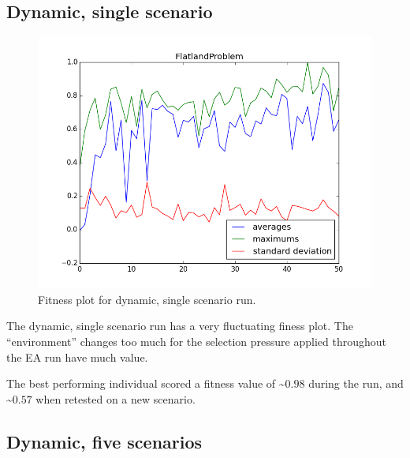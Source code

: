\documentclass[twoside]{article}
\begin{document}
\begin{multicols}{2}
  \subsection{Dynamic, single scenario}
  
  \begin{figure}[H]
    \centering
    \includegraphics[width=\linewidth]{images/dynamic_1.png}
    \caption{Fitness plot for dynamic, single scenario run.} \label{fig:static-single}
  \end{figure}

  The dynamic, single scenario run has a very fluctuating finess plot.
  The ``environment'' changes too much for the selection pressure applied throughout the EA run have much value.

  The best performing individual scored a fitness value of \textasciitilde $0.98$ during the run, and \textasciitilde $0.57$ when retested on a new scenario.

  \subsection{Dynamic, five scenarios}
  

\end{multicols}
\end{document}

